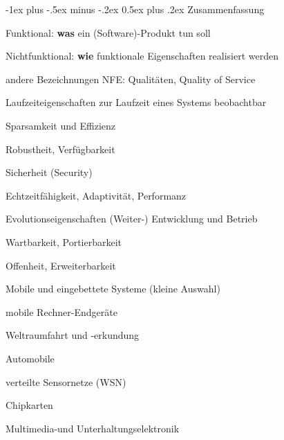 \documentclass[a4paper]{article}
\makeatletter
\renewcommand{\section}{\@startsection{section}{1}{0mm}%
 {-1ex plus -.5ex minus -.2ex}%
 {0.5ex plus .2ex}%
 {\normalfont\large\bfseries}}
\makeatother
\begin{document}
\raggedright
\begin{multicols}{3}\scriptsize %

    \section{Zusammenfassung}
    \begin{itemize*}
        \item Funktional: \textbf{was} ein (Software)-Produkt tun soll
        \item Nichtfunktional: \textbf{wie} funktionale Eigenschaften realisiert werden
        \item andere Bezeichnungen NFE: Qualitäten, Quality of Service
    \end{itemize*}
    \begin{description*}
        \item[Laufzeiteigenschaften] zur Laufzeit eines Systems beobachtbar
        \begin{itemize*}
            \item Sparsamkeit und Effizienz
            \item Robustheit, Verfügbarkeit
            \item Sicherheit (Security)
            \item Echtzeitfähigkeit, Adaptivität, Performanz
        \end{itemize*}
        \item[Evolutionseigenschaften] (Weiter-) Entwicklung und Betrieb
        \begin{itemize*}
            \item Wartbarkeit, Portierbarkeit
            \item Offenheit, Erweiterbarkeit
        \end{itemize*}
    \end{description*}
    Mobile und eingebettete Systeme (kleine Auswahl)
    \begin{itemize*}
        \item mobile Rechner-Endgeräte
        \item Weltraumfahrt und -erkundung
        \item Automobile
        \item verteilte Sensornetze (WSN)
        \item Chipkarten
        \item Multimedia-und Unterhaltungselektronik
    \end{itemize*}


\end{multicols}
\end{document}
